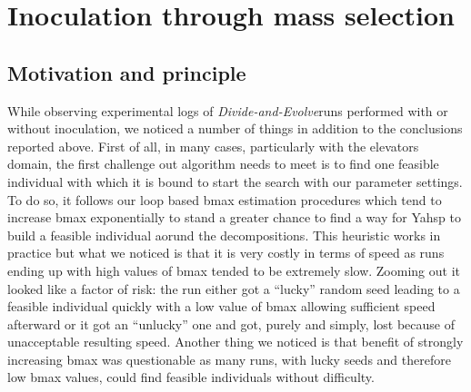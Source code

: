 \documentclass[english]{DESCARWINreport}
\newcommand{\dae}{{\em Divide-and-Evolve}}
\begin{document}
\newpage









\chapter{Inoculation through mass selection}

\section{Motivation and principle}

While observing experimental logs of \dae runs performed with or without inoculation, we noticed a number of things in addition to the conclusions reported above. First of all, in many cases, particularly with the elevators domain, the first challenge out algorithm needs to meet is to find one feasible individual with which it is bound to start the search with our parameter settings. To do so, it follows our loop based bmax estimation procedures which tend to increase bmax exponentially to stand a greater chance to find a way for Yahsp to build a feasible individual aorund the decompositions. This heuristic works in practice but what we noticed is that it is very costly in terms of speed as runs ending up with high values of bmax tended to be extremely slow. Zooming out it looked like a factor of risk: the run either got a "`lucky"' random seed leading to a feasible individual quickly with a low value of bmax allowing sufficient speed afterward or it got an "`unlucky"' one and got, purely and simply, lost because of unacceptable resulting speed. Another thing we noticed is that benefit of strongly increasing bmax was questionable as many runs, with lucky seeds and therefore low bmax values, could find feasible individuals without difficulty.
\end{document}
